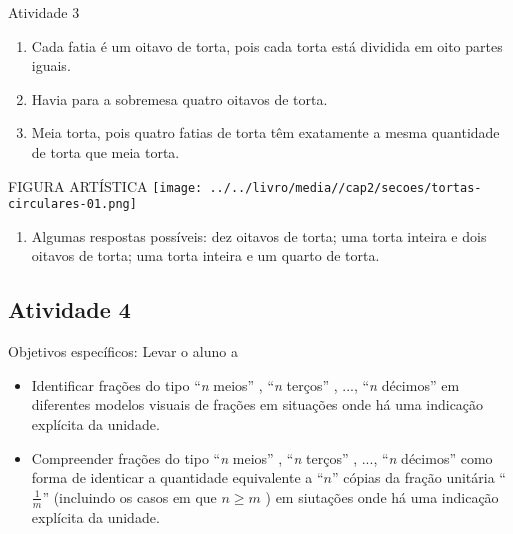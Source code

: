 \documentclass[oneside]{book}
\begin{document}
\begin{multicols}{2}
\begin{resposta*}{Atividade 3}
\begin{enumerate} [\quad a)] %
    \item       Cada fatia é um oitavo de torta, pois cada torta está dividida em oito partes iguais.
    \item       Havia para a sobremesa quatro oitavos de torta.
    \item       Meia torta, pois quatro fatias de torta têm exatamente a mesma quantidade de torta que meia torta.      \mbox{} \newline
\end{enumerate} %
  \begin{imagem*}[breakable]{}{}     FIGURA ARTÍSTICA         \texttt{[image: ../../livro/media//cap2/secoes/tortas-circulares-01.png]}  \end{imagem*}
\begin{enumerate} [\quad a)] %
    \item       Algumas respostas possíveis: dez oitavos de torta;  uma torta inteira e dois oitavos de torta; uma torta inteira e um quarto de torta.
\end{enumerate} %

\end{resposta*}



\subsection{Atividade 4}





  Objetivos específicos: Levar o aluno a
\begin{itemize} %
    \item       Identificar frações do tipo       ``{\it n} meios''      ,       ``{\it n} terços''      , ...,       ``{\it n} décimos''       em diferentes modelos visuais de frações em situações onde há uma indicação explícita da unidade.
    \item       Compreender frações do tipo       ``{\it n} meios''      ,       ``{\it n} terços''      , ...,       ``{\it n} décimos''       como forma de identicar a quantidade equivalente a       ``$n$''       cópias da fração unitária       ``$\frac{1}{m}$''       (incluindo os casos em que       $n \geq m$      ) em siutações onde há uma indicação explícita da unidade.
\end{itemize} %



\end{multicols}
\end{document}
